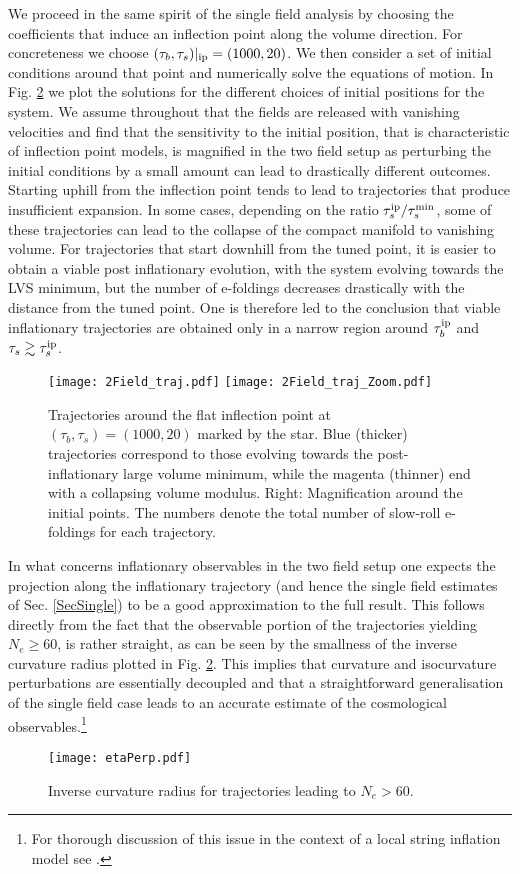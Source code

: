 \documentclass[11pt,a4paper]{article}
\begin{document}
We proceed in the same spirit of the single field analysis by choosing the coefficients that induce an inflection point along the volume direction. For concreteness we choose $(\tau_b,\tau_s)|_{\rm ip}=(1000,20)$. We then consider a set of initial conditions around that point and numerically solve the equations of motion. In Fig. \ref{fig:2FieldLVS} we plot the solutions for the different choices of initial positions for the system. We assume throughout that the fields are released with vanishing velocities and find that the sensitivity to the initial position, that is characteristic of inflection point models, is magnified in the two field setup as perturbing the initial conditions by a small amount can lead to drastically different outcomes. Starting uphill from the inflection point tends to lead to trajectories that produce insufficient expansion. In some cases, depending on the ratio $\tau_s^{\rm ip}/\tau_s^{\rm min}$, some of these trajectories can lead to the collapse of the compact manifold to vanishing volume. For trajectories that start downhill from the tuned point, it is easier to obtain a viable post inflationary evolution, with the system evolving towards the LVS minimum, but the number of e-foldings decreases drastically with the distance from the tuned point. One is therefore led to the conclusion that viable inflationary trajectories are obtained only in a narrow region around $\tau_b^{\rm ip}$ and $\tau_s\gtrsim \tau_s^{\rm ip}$.

\begin{figure}[h!]
\centering
{\texttt{[image: 2Field\_traj.pdf]}} \quad
{\texttt{[image: 2Field\_traj\_Zoom.pdf]}} 
\caption{Trajectories around the flat inflection point at $(\tau_b,\tau_s)= (1000 , 20)$ marked by the star. Blue (thicker) trajectories correspond to those evolving towards the post-inflationary large volume minimum, while the magenta (thinner) end with a collapsing volume modulus. Right: Magnification around the initial points. The numbers denote the total number of slow-roll e-foldings for each trajectory.}
\label{fig:2FieldLVS}
\end{figure}

In what concerns inflationary observables in the two field setup one expects the projection along the inflationary trajectory (and hence the single field estimates of Sec. \ref{SecSingle}) to be a good approximation to the full result. This follows directly from the fact that the observable portion of the trajectories yielding $N_e\ge 60$, is rather straight, as can be seen by the smallness of the inverse curvature radius plotted in Fig. \ref{fig:2FieldLVS}. This implies that curvature and isocurvature perturbations are essentially decoupled and that a straightforward generalisation of the single field case leads to an accurate estimate of the cosmological observables.\footnote{For thorough discussion of this issue in the context of a local string inflation model see \cite{Bielleman:2015lka}.}
\begin{figure}[h!]
\centering
{\texttt{[image: etaPerp.pdf]}} 
\caption{Inverse curvature radius for trajectories leading to $N_e>60.$}
\label{fig:2FieldLVS}
\end{figure}
\end{document}
